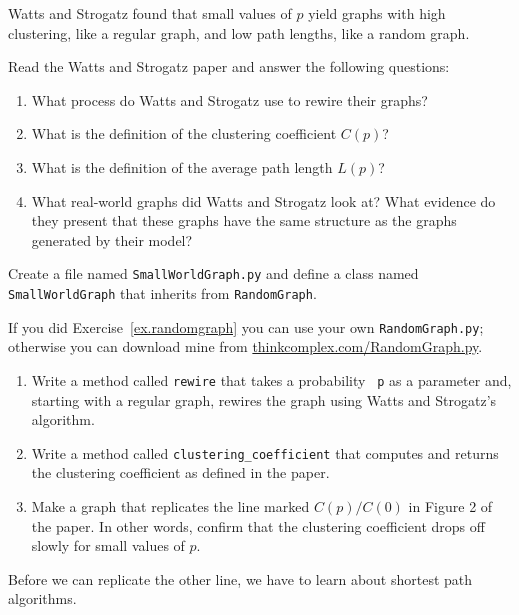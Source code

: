 \documentclass[10pt]{book}
\begin{document}
Watts and Strogatz found that small values of $p$ yield graphs
with high clustering, like a regular graph, and low path
lengths, like a random graph.

\begin{exercise}

Read the Watts and Strogatz paper and answer the following
questions:

\begin{enumerate}

\item What process do Watts and Strogatz use to rewire their
graphs?

\item What is the definition of the clustering coefficient $C(p)$?

\item What is the definition of the average path length $L(p)$?

\item What real-world graphs did Watts and Strogatz look at?
What evidence do they present that these graphs have the
same structure as the graphs generated by their model?

\end{enumerate}

\end{exercise}


\begin{exercise}

Create a file named {\tt SmallWorldGraph.py} and define a class named
{\tt SmallWorldGraph} that inherits from {\tt RandomGraph}.

If you did Exercise~\ref{ex.randomgraph} you can use your own
{\tt RandomGraph.py}; otherwise you can download mine from
\url{thinkcomplex.com/RandomGraph.py}.

\begin{enumerate}

\item Write a method called {\tt rewire} that takes a probability {\tt
  p} as a parameter and, starting with a regular graph, rewires
the graph using Watts and Strogatz's algorithm.

\item Write a method called \verb"clustering_coefficient" that
computes and returns the clustering coefficient as defined in the
paper.

\item Make a graph that replicates the line marked $C(p)/C(0)$ in
Figure 2 of the paper.  In other words,
confirm that the clustering coefficient drops off slowly for
small values of $p$.

\end{enumerate}

Before we can replicate the other line, we have to learn about shortest
path algorithms.

\end{exercise}
\end{document}

